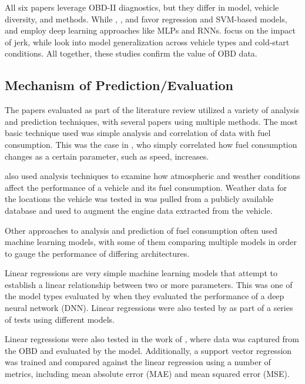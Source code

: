 \documentclass[letterpaper]{article}
\begin{document}
All six papers leverage OBD-II diagnostics, but they differ in model, vehicle diversity,
and methods. While \cite{abukhalil2020fuel}, \cite{Manjunath2024}, and \cite{abediasl2024real}
favor regression and SVM-based models, \cite{rykala2023modeling} and \cite{yen_combining_2021} 
employ deep learning approaches like MLPs and RNNs. \cite{zhang2023novel} focus on the impact 
of jerk, while \cite{abediasl2024real} look into model generalization across vehicle types and
cold-start conditions. All together, these studies confirm the value of OBD data.


\subsection*{Mechanism of Prediction/Evaluation}

The papers evaluated as part of the literature review utilized a variety of
analysis and prediction techniques, with several papers using multiple methods.
The most basic technique used was simple analysis and correlation of data with
fuel consumption. This was the case in \cite{al2007experimental}, who
simply correlated how fuel consumption changes as a certain parameter, such as
speed, increases. 

\cite{filla2025using} also used analysis techniques to
examine how atmospheric and weather conditions affect the performance of a
vehicle and its fuel consumption. Weather data for the locations the vehicle was
tested in was pulled from a publicly available database and used to augment the
engine data extracted from the vehicle. 

Other approaches to analysis and prediction of fuel consumption often used machine 
learning models, with some of them comparing multiple models in order to gauge the 
performance of differing architectures. 

Linear regressions are very simple machine  learning models that attempt to establish 
a linear relationship between two or more  parameters. This was one of the model types 
evaluated by \cite{topic2022neural} when they evaluated the performance of a deep 
neural network (DNN). Linear regressions were also tested by \cite{yang2022predicting} 
as part of a series of tests using different models. 

Linear regressions were also tested in the work of
\cite{Manjunath2024}, where data was captured from the OBD and evaluated by the
model. Additionally, a support vector regression was trained and compared
against the linear regression using a number of metrics, including mean absolute
error (MAE) and mean squared error (MSE). 
\end{document}

